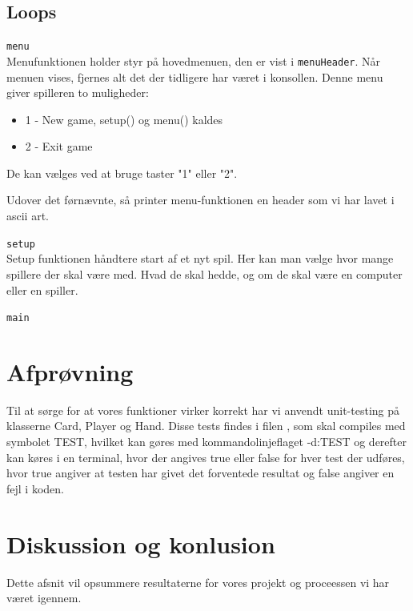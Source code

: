 \documentclass[a4paper]{article}
\begin{document}
    \subsection{Loops} \label{ssec:loops}
    \begin{description}
      \item{\texttt{menu}}~\\
      Menufunktionen holder styr på hovedmenuen, den er vist i \lstinline$menuHeader$.
      Når menuen vises, fjernes alt det der tidligere har været i konsollen.
      Denne menu giver spilleren to muligheder:
      \begin{itemize}
        \item 1 - New game, setup() og menu() kaldes
        \item 2 - Exit game
      \end{itemize}
      De kan vælges ved at bruge taster "1" eller "2".
      
      Udover det førnævnte, så printer menu-funktionen en header som
      vi har lavet i ascii art.

    \item{\texttt{setup}}~\\
      Setup funktionen håndtere start af et nyt spil. Her kan man
      vælge hvor mange spillere der skal være med. Hvad de skal hedde,
      og om de skal være en computer eller en spiller.
      
      \item{\texttt{main}}~\\
        
    \end{description}
      
  \section{Afprøvning} \label{sec:unitTest}
    Til at sørge for at vores funktioner virker korrekt har vi
    anvendt unit-testing på klasserne Card, Player og Hand.
    Disse tests findes i filen , som skal
    compiles med symbolet TEST, hvilket kan gøres med
    kommandolinjeflaget -d:TEST og derefter kan køres i en
    terminal, hvor der angives true eller false for hver test
    der udføres, hvor true angiver at testen har givet det
    forventede resultat og false angiver en fejl i koden.

	\section{Diskussion og konlusion} \label{sec:conclusion}
    Dette afsnit vil opsummere resultaterne for vores projekt og proceessen vi har været igennem.
\end{document}
